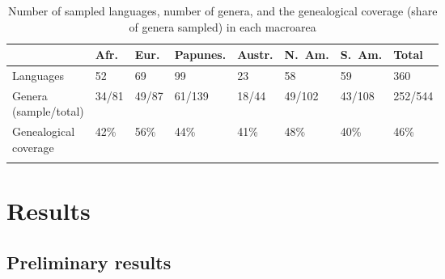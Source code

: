 \documentclass[output=collectionpaper]{langsci/langscibook}
\begin{document}
%
\begin{table}[htb]
\small
\begin{tabular}{@{} l l l l l l l l @{}}
\lsptoprule
&  Afr. & Eur. & Papunes. & Austr. & N.~Am. & S.~Am. & {Total}\footnotemark{}\\
\midrule
Languages & 52 & 69 & 99 & 23 & 58 & 59 & 360 \\
\specialcell{Genera\\ (sample/total)} & 34/81 & 49/87 & 61/139 & 18/44 & 49/102 & 43/108 & 252/544 \\
\specialcell{Genealogical\\ coverage} & 42\% & 56\% & 44\% & 41\% & 48\% & 40\% & 46\% \\
\lspbottomrule
\end{tabular}
\caption{%
Number of sampled languages, number of genera, and the genealogical coverage (share of genera sampled) in each macroarea
}%
\label{tab:Sinne:2}
\end{table}
%


\section{Results}
\label{sec:Sinne:4}

\subsection{Preliminary results}
\label{sec:Sinne:4.1}
\end{document}
